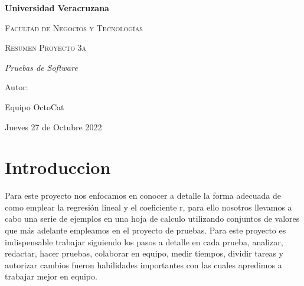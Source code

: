 \documentclass{report}
\begin{document}
\begin{titlepage}
\centering
{\bfseries\LARGE Universidad Veracruzana \par}
\vspace{1cm}
{\scshape\Large Facultad de Negocios y Tecnolog\'ias  \par}
\vspace{3cm}
{\scshape\Huge Resumen Proyecto 3a \par}
\vspace{3cm}
{\itshape\Large Pruebas de Software \par}
\vfill
{\Large Autor: \par}
{\Large Equipo OctoCat \par}
\vfill
{\large Jueves 27 de Octubre 2022 \par}

\end{titlepage}



\section{Introduccion}

Para este proyecto nos enfocamos en conocer a detalle la forma adecuada de como emplear la regresión lineal y el coeficiente r, para ello nosotros llevamos a cabo una serie de ejemplos en una hoja de calculo utilizando conjuntos de valores que más adelante empleamos en el proyecto de pruebas. Para este proyecto es indispensable trabajar siguiendo los pasos a detalle en cada prueba, analizar, redactar, hacer pruebas, colaborar en equipo, medir tiempos, dividir tareas y autorizar cambios fueron habilidades importantes con las cuales apredimos a trabajar mejor en equipo. 
\end{document}
